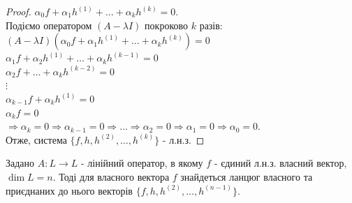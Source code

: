 \begin{proof}
$\alpha_0 f + \alpha_1 h^{(1)} + \dots + \alpha_k h^{(k)} = 0$.\\
Подіємо оператором $(A-\lambda I)$ покроково $k$ разів:\\
$(A-\lambda I)(\alpha_0 f + \alpha_1 h^{(1)} + \dots + \alpha_k h^{(k)}) = 0$\\
$\alpha_1 f + \alpha_2 h^{(1)} + \dots + \alpha_k h^{(k-1)} = 0$\\
$\alpha_2 f + \dots + \alpha_k h^{(k-2)} = 0$\\
$\vdots$\\
$\alpha_{k-1} f + \alpha_k h^{(1)} = 0$\\
$\alpha_k f = 0$\\
$\Rightarrow \alpha_k = 0 \Rightarrow \alpha_{k-1} = 0 \Rightarrow \dots \Rightarrow \alpha_2 = 0 \Rightarrow \alpha_1 = 0 \Rightarrow \alpha_0 = 0$.\\
Отже, система $\{f,h,h^{(2)},\dots,h^{(k)}\}$ - л.н.з.
\end{proof}

\begin{theorem}
Задано $A: L \to L$ - лінійний оператор, в якому $f$ - єдиний л.н.з. власний вектор, $\dim L = n$. Тоді для власного вектора $f$ знайдеться ланцюг власного та приєднаних до нього векторів $\{f,h,h^{(2)},\dots,h^{(n-1)}\}$.
\end{theorem}

